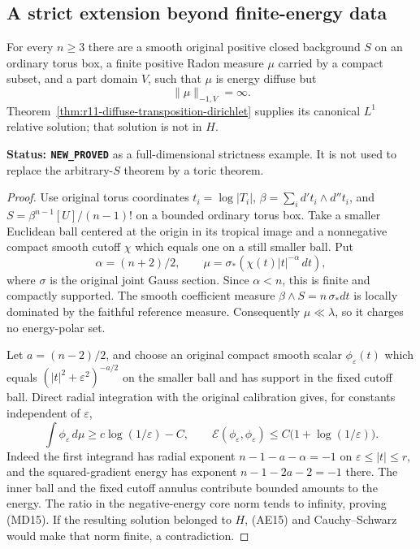 \subsection{A strict extension beyond finite-energy data}

\begin{proposition}
\label{prop:r11-infinite-energy-diffuse-example}
For every $n\geq3$ there are a smooth original positive closed
background $S$ on an ordinary torus box, a finite positive Radon
measure $\mu$ carried by a compact subset, and a part domain $V$,
such that $\mu$ is energy diffuse but
\[
                              \|\mu\|_{-1,V}=\infty.
 \tag{MD15}
\]
Theorem~\ref{thm:r11-diffuse-transposition-dirichlet} supplies
its canonical $L^1$ relative solution; that solution is not in $H$.
\end{proposition}

\noindent\textbf{Status: \texttt{NEW\_PROVED}} as a full-dimensional
strictness example.  It is not used to replace the arbitrary-$S$
theorem by a toric theorem.

\begin{proof}
Use original torus coordinates $t_i=\log|T_i|$,
$\beta=\sum_i d't_i\wedge d''t_i$, and
$S=\beta^{n-1}[U]/(n-1)!$ on a bounded ordinary torus box.
Take a smaller Euclidean ball centered at the origin in its
tropical image and a nonnegative compact smooth cutoff $\chi$
which equals one on a still smaller ball.  Put
\[
 \alpha=(n+2)/2,\qquad
                 \mu=\sigma_*(\chi(t)|t|^{-\alpha}\,dt),
 \tag{MD16}
\]
where $\sigma$ is the original joint Gauss section.
Since $\alpha<n$, this is finite and compactly supported.
The smooth coefficient measure $\beta\wedge S=n\,\sigma_*dt$
is locally dominated by the faithful reference measure.
Consequently $\mu\ll\lambda$, so it charges no energy-polar set.

Let $a=(n-2)/2$, and choose an original compact smooth scalar
$\phi_\varepsilon(t)$ which equals
$(|t|^2+\varepsilon^2)^{-a/2}$ on the smaller ball and has
support in the fixed cutoff ball.  Direct radial integration
with the original calibration gives, for constants independent
of $\varepsilon$,
\[
 \int\phi_\varepsilon\,d\mu\geq c\log(1/\varepsilon)-C,\qquad
             \mathcal E(\phi_\varepsilon,\phi_\varepsilon)
                      \leq C\bigl(1+\log(1/\varepsilon)\bigr).
 \tag{MD17}
\]
Indeed the first integrand has radial exponent
$n-1-a-\alpha=-1$ on $\varepsilon\leq|t|\leq r$,
and the squared-gradient energy has exponent
$n-1-2a-2=-1$ there.  The inner ball and the fixed cutoff
annulus contribute bounded amounts to the energy.
The ratio in the negative-energy core norm tends to infinity,
proving (MD15).  If the resulting solution belonged to $H$,
(AE15) and Cauchy--Schwarz would make that norm finite,
a contradiction.
\end{proof}


